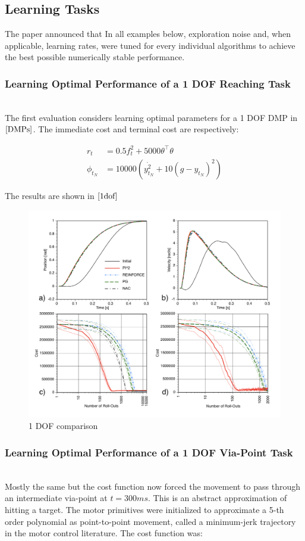 \documentclass[journal]{IEEEtran}
\begin{document}
\subsection{Learning Tasks}

The paper announced that In all examples below, exploration noise and, when applicable, learning rates, were tuned for every individual algorithms to achieve the best possible numerically stable performance.

\subsubsection{Learning Optimal Performance of a 1 DOF Reaching Task}
\ \\
The first evaluation considers learning optimal parameters for a 1 DOF DMP in $\ref{DMPs}$. The immediate cost and terminal cost are respectively:

\begin{equation} 
  \begin{aligned}
    r_t &= 0.5f_t^2 + 5000\theta^{\top}\theta \\
    \phi_{t_N} &= 10000(\dot{y_{t_N}^2}+10(g-y_{t_N})^2)  \nonumber 
  \end{aligned}
\end{equation}

The results are shown in $\ref{1dof}$

\begin{figure}[htbp]
  \includegraphics[width = .5\textwidth]{1dof}
  \caption{1 DOF comparison}
  \label{1dof}
\end{figure}


\subsubsection{Learning Optimal Performance of a 1 DOF Via-Point Task}
\ \\
Mostly the same but the cost function now forced the movement to pass through an intermediate via-point at $t = 300ms$. This is an abstract approximation of hitting a
target. The motor primitives were initialized to approximate a 5-th order polynomial as point-to-point movement,  called a minimum-jerk trajectory in the motor control literature.
The cost function was:
\end{document}
